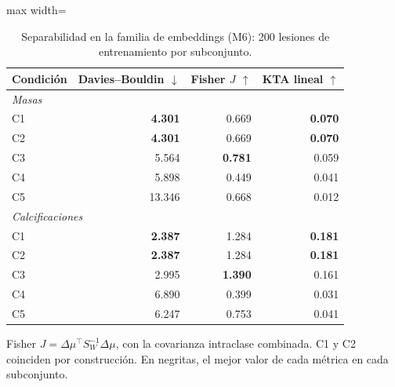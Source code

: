 \begin{table}[H]
\centering
\small
\caption{Separabilidad en la familia de embeddings (M6): 200 lesiones de entrenamiento por subconjunto.}
\label{tab:m6_embeddings}
\begin{adjustbox}{max width=\linewidth}
\begin{tabular}{l r r r}
\toprule
Condición & Davies--Bouldin $\downarrow$ & Fisher $J$ $\uparrow$ & KTA lineal $\uparrow$ \\
\midrule
\multicolumn{4}{l}{\textit{Masas}} \\
\quad C1 & \textbf{4.301} & 0.669 & \textbf{0.070} \\
\quad C2 & \textbf{4.301} & 0.669 & \textbf{0.070} \\
\quad C3 & 5.564 & \textbf{0.781} & 0.059 \\
\quad C4 & 5.898 & 0.449 & 0.041 \\
\quad C5 & 13.346 & 0.668 & 0.012 \\
\multicolumn{4}{l}{\textit{Calcificaciones}} \\
\quad C1 & \textbf{2.387} & 1.284 & \textbf{0.181} \\
\quad C2 & \textbf{2.387} & 1.284 & \textbf{0.181} \\
\quad C3 & 2.995 & \textbf{1.390} & 0.161 \\
\quad C4 & 6.890 & 0.399 & 0.031 \\
\quad C5 & 6.247 & 0.753 & 0.041 \\
\bottomrule
\end{tabular}
\end{adjustbox}
\par\smallskip
\parbox{0.95\linewidth}{\footnotesize Fisher $J = \Delta\mu^\top S_W^{-1} \Delta\mu$, con la covarianza intraclase combinada. C1 y C2 coinciden por construcción. En negritas, el mejor valor de cada métrica en cada subconjunto.}
\end{table}
